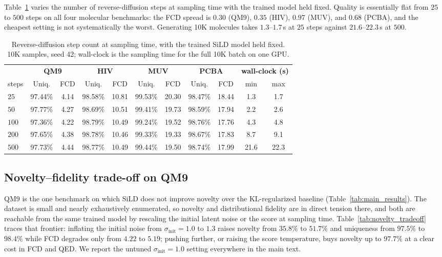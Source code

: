 Table~\ref{tab:steps_sweep} varies the number of reverse-diffusion steps at
sampling time with the trained model held fixed. Quality is essentially flat
from $25$ to $500$ steps on all four molecular benchmarks: the FCD spread is
$0.30$ (QM9), $0.35$ (HIV), $0.97$ (MUV), and $0.68$ (PCBA), and the cheapest
setting is not systematically the worst. Generating 10K molecules takes
$1.3$--$1.7$\,s at $25$ steps against $21.6$--$22.3$\,s at $500$.

\begin{table}[h]
\centering
\caption{%
Reverse-diffusion step count at sampling time, with the trained SiLD model
held fixed. 10K samples, seed 42; wall-clock is the sampling time for the
full 10K batch on one GPU.%
}
\label{tab:steps_sweep}
\small
\begin{tabular}{lcccccccccc}
\toprule
& \multicolumn{2}{c}{\textbf{QM9}} & \multicolumn{2}{c}{\textbf{HIV}}
& \multicolumn{2}{c}{\textbf{MUV}} & \multicolumn{2}{c}{\textbf{PCBA}}
& \multicolumn{2}{c}{\textbf{wall-clock (s)}} \\
\cmidrule(lr){2-3}\cmidrule(lr){4-5}\cmidrule(lr){6-7}\cmidrule(lr){8-9}\cmidrule(lr){10-11}
steps & Uniq. & FCD & Uniq. & FCD & Uniq. & FCD & Uniq. & FCD & min & max \\
\midrule
$25$  & 97.44\% & 4.14 & 98.58\% & 10.81 & 99.53\% & 20.30 & 98.47\% & 18.44 & 1.3 & 1.7 \\
$50$  & 97.77\% & 4.27 & 98.69\% & 10.51 & 99.41\% & 19.73 & 98.59\% & 17.94 & 2.2 & 2.6 \\
$100$ & 97.36\% & 4.22 & 98.79\% & 10.49 & 99.24\% & 19.52 & 98.76\% & 17.76 & 4.3 & 4.8 \\
$200$ & 97.65\% & 4.38 & 98.78\% & 10.46 & 99.33\% & 19.33 & 98.67\% & 17.83 & 8.7 & 9.1 \\
$500$ & 97.73\% & 4.44 & 98.77\% & 10.49 & 99.44\% & 19.50 & 98.74\% & 17.99 & 21.6 & 22.3 \\
\bottomrule
\end{tabular}
\end{table}

\subsection{Novelty--fidelity trade-off on QM9}
\label{app:novelty-tradeoff}

QM9 is the one benchmark on which SiLD does not improve novelty over the
KL-regularized baseline (Table~\ref{tab:main_results}). The dataset is small
and nearly exhaustively enumerated, so novelty and distributional fidelity
are in direct tension there, and both are reachable from the same trained
model by rescaling the initial latent noise or the score at sampling time.
Table~\ref{tab:novelty_tradeoff} traces that frontier: inflating the initial
noise from $\sigma_{\mathrm{init}}=1.0$ to $1.3$ raises novelty from $35.8\%$
to $51.7\%$ and uniqueness from $97.5\%$ to $98.4\%$ while FCD degrades only
from $4.22$ to $5.19$; pushing further, or raising the score temperature,
buys novelty up to $97.7\%$ at a clear cost in FCD and QED. We report the
untuned $\sigma_{\mathrm{init}}=1.0$ setting everywhere in the main text.

